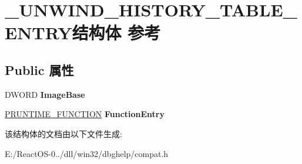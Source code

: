 \hypertarget{struct___u_n_w_i_n_d___h_i_s_t_o_r_y___t_a_b_l_e___e_n_t_r_y}{}\section{\+\_\+\+U\+N\+W\+I\+N\+D\+\_\+\+H\+I\+S\+T\+O\+R\+Y\+\_\+\+T\+A\+B\+L\+E\+\_\+\+E\+N\+T\+R\+Y结构体 参考}
\label{struct___u_n_w_i_n_d___h_i_s_t_o_r_y___t_a_b_l_e___e_n_t_r_y}
\subsection*{Public 属性}
\begin{DoxyCompactItemize}
\item 
\mbox{\label{struct___u_n_w_i_n_d___h_i_s_t_o_r_y___t_a_b_l_e___e_n_t_r_y_ada7a6ccc560f52afc9ea7a73024cafb3}} 
D\+W\+O\+RD {\bfseries Image\+Base}
\item 
\mbox{\label{struct___u_n_w_i_n_d___h_i_s_t_o_r_y___t_a_b_l_e___e_n_t_r_y_ac4440f4f21030bb51fc0b76d69b74ab0}} 
\hyperlink{struct___r_u_n_t_i_m_e___f_u_n_c_t_i_o_n}{P\+R\+U\+N\+T\+I\+M\+E\+\_\+\+F\+U\+N\+C\+T\+I\+ON} {\bfseries Function\+Entry}
\end{DoxyCompactItemize}


该结构体的文档由以下文件生成\+:\begin{DoxyCompactItemize}
\item 
E\+:/\+React\+O\+S-\/0../dll/win32/dbghelp/compat.\+h\end{DoxyCompactItemize}
